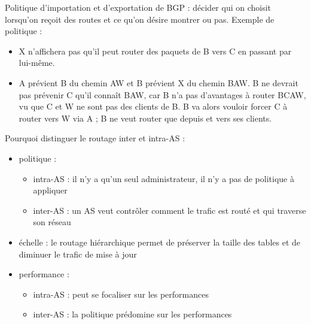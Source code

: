	Politique d'importation et d'exportation de BGP : décider qui on choisit lorsqu'on reçoit des routes et ce qu'on désire montrer ou pas. Exemple de politique :
	
	
	\begin{itemize}
		\item X n'affichera pas qu'il peut router des paquets de B vers C en passant par lui-même.
		\item A prévient B du chemin AW et B prévient X du chemin BAW. B ne devrait pas prévenir C qu'il connaît BAW, car B n'a pas d'avantages à router BCAW, vu que C et W ne sont pas des clients de B. B va alors vouloir forcer C à router vers W via A ; B ne veut router que depuis et vers ses clients.
	\end{itemize}
	
	Pourquoi distinguer le routage inter et intra-AS :
	
	\begin{itemize}
		\item politique :
		
		\begin{itemize}
			
			\item intra-AS : il n'y a qu'un seul administrateur, il n'y a pas de politique à appliquer
			\item inter-AS : un AS veut contrôler comment le trafic est routé et qui traverse son réseau
		\end{itemize}
		\item échelle : le routage hiérarchique permet de préserver la taille des tables et de diminuer le trafic de mise à jour
		\item performance :
		
		\begin{itemize}
			\item intra-AS : peut se focaliser sur les performances
			\item inter-AS : la politique prédomine sur les performances
		\end{itemize}
	\end{itemize}
	
